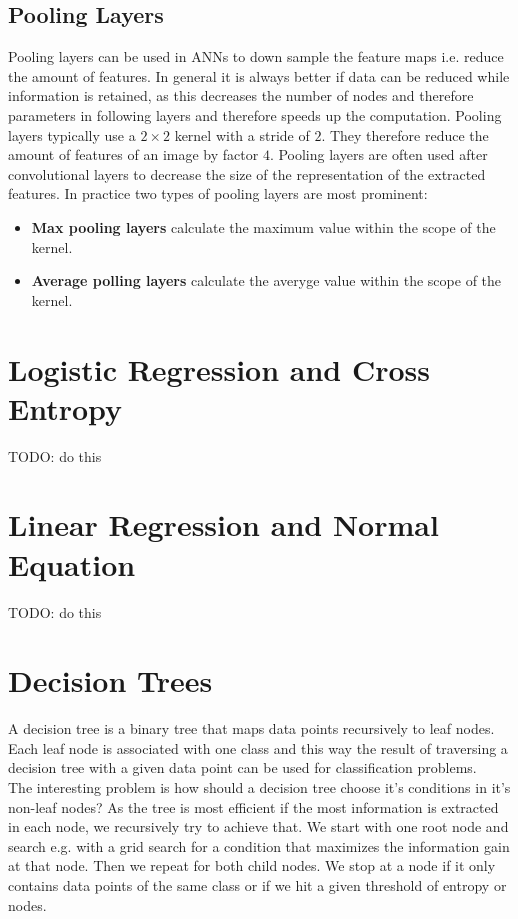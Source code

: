 \subsection{Pooling Layers}

Pooling layers can be used in ANNs to down sample the feature maps i.e. reduce the amount of features. In general it is always better if data can be reduced while information is retained, as this decreases the number of nodes and therefore parameters in following layers and therefore speeds up the computation. Pooling layers typically use a $2 \times 2$ kernel with a stride of $2$. They therefore reduce the amount of features of an image by factor $4$. Pooling layers are often used after convolutional layers to decrease the size of the representation of the extracted features. In practice two types of pooling layers are most prominent:

\begin{itemize}
    \item \textbf{Max pooling layers} calculate the maximum value within the scope of the kernel.
    \item \textbf{Average polling layers} calculate the averyge value within the scope of the kernel.
\end{itemize}

\section{Logistic Regression and Cross Entropy}

TODO: do this


\section{Linear Regression and Normal Equation}

TODO: do this


\section{Decision Trees}

A decision tree is a binary tree that maps data points recursively to leaf nodes. Each leaf node is associated with one class and this way the result of traversing a decision tree with a given data point can be used for classification problems.\\
The interesting problem is how should a decision tree choose it's conditions in it's non-leaf nodes? As the tree is most efficient if the most information is extracted in each node, we recursively try to achieve that. We start with one root node and search e.g. with a grid search for a condition that maximizes the information gain at that node. Then we repeat for both child nodes. We stop at a node if it only contains data points of the same class or if we hit a given threshold of entropy or nodes.\\

